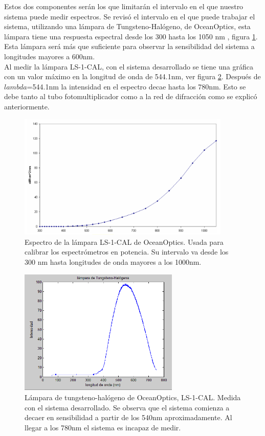 Estos dos componentes serán los que limitarán el intervalo en el que nuestro sistema puede medir espectros. Se revisó el intervalo en el que puede trabajar el sistema, utilizando una lámpara de Tungsteno-Halógeno, de OceanOptics, esta lámpara tiene una respuesta espectral desde los 300 hasta los 1050 nm \cite{Manual1000}, figura \ref{fig:lamparathd}. Esta lámpara será más que suficiente para observar la sensibilidad del sistema a longitudes mayores a 600nm.\\
Al medir la lámpara LS-1-CAL, con el sistema desarrollado se tiene una gráfica con un valor máximo en la longitud de onda de 544.1nm, ver figura \ref{fig:lamparath}. Después de $lambda$=544.1nm la intensidad en el espectro decae hasta los 780nm. Esto se debe tanto al tubo fotomultiplicador como a la red de difracción como se explicó anteriormente.
\begin{figure}
	\centering
	\includegraphics[width=1\linewidth,height=6cm]{Imagenes/3/lamparaTH_DPNG}
	\caption{Espectro de la lámpara LS-1-CAL de OceanOptics. Usada para calibrar los espectrómetros en potencia. Su intervalo va desde los 300 nm hasta longitudes de onda mayores a los 1000nm. \cite{Manual1000}}
	\label{fig:lamparathd}
\end{figure}
\begin{figure}
	\centering
	\includegraphics[width=1\linewidth,height=6cm]{Imagenes/3/lamparaTH}
	\caption{Lámpara de tungsteno-halógeno de OceanOptics, LS-1-CAL. Medida con el sistema desarrollado. Se observa que el sistema comienza a decaer en sensibilidad a partir de los 540nm aproximadamente. Al llegar a los 780nm el sistema es incapaz de medir.}
	\label{fig:lamparath}
\end{figure}


